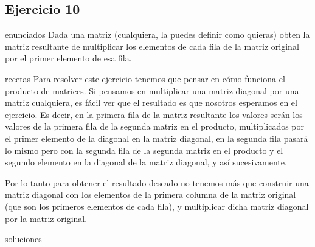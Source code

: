 \subsection{Ejercicio 10}
\def\parte{enunciados}
\ifx\capitulo\parte
Dada una matriz (cualquiera, la puedes definir como quieras) obten la matriz resultante de multiplicar los elementos de cada fila de la matriz original por el primer elemento de esa fila.
\fi

\def\parte{recetas}
\ifx\capitulo\parte
Para resolver este ejercicio tenemos que pensar en cómo funciona el producto de matrices. Si pensamos en multiplicar una matriz diagonal por una matriz cualquiera, es fácil ver que el resultado es que nosotros esperamos en el ejercicio. Es decir, en la primera fila de la matriz resultante los valores serán los valores de la primera fila de la segunda matriz en el producto, multiplicados por el primer elemento de la diagonal en la matriz diagonal, en la segunda fila pasará lo mismo pero con la segunda fila de la segunda matriz en el producto y el segundo elemento en la diagonal de la matriz diagonal, y así sucesivamente.

Por lo tanto para obtener el resultado deseado no tenemos más que construir una matriz diagonal con los elementos de la primera columna de la matriz original (que son los primeros elementos de cada fila), y multiplicar dicha matriz diagonal por la matriz original.
\fi

\def\parte{soluciones}
\ifx\capitulo\parte

\fi
